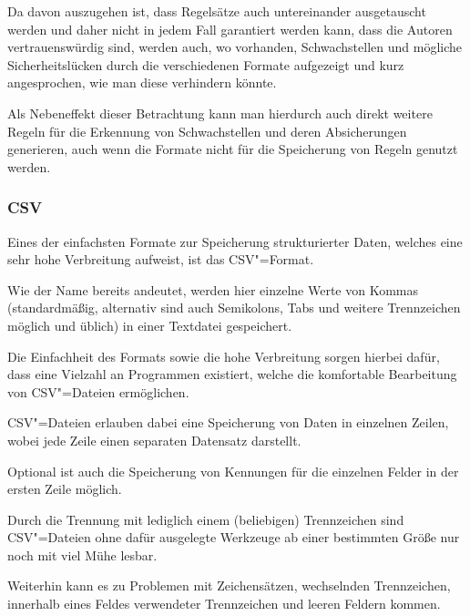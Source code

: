             Da davon auszugehen ist,
            dass Regelsätze auch untereinander ausgetauscht werden und
            daher nicht in jedem Fall garantiert werden kann,
            dass die Autoren vertrauenswürdig sind,
            werden auch, wo vorhanden,
            Schwachstellen und
            mögliche Sicherheitslücken durch die verschiedenen Formate aufgezeigt und
            kurz angesprochen,
            wie man diese verhindern könnte.

            Als Nebeneffekt dieser Betrachtung kann man hierdurch auch direkt weitere Regeln für die Erkennung von Schwachstellen und
            deren Absicherungen generieren,
            auch wenn die Formate nicht für die Speicherung von Regeln genutzt werden.

            \subsubsection{CSV}
                Eines der einfachsten Formate zur Speicherung strukturierter Daten,
                welches eine sehr hohe Verbreitung aufweist,
                ist das
                \gls{CSV}"=Format.

                Wie der Name bereits andeutet,
                werden hier einzelne Werte von Kommas
                (standardmäßig,
                alternativ sind auch Semikolons,
                Tabs und
                weitere Trennzeichen möglich und
                üblich) in einer Textdatei gespeichert.

                Die Einfachheit des Formats sowie
                die hohe Verbreitung sorgen hierbei dafür,
                dass eine Vielzahl an Programmen existiert,
                welche die komfortable Bearbeitung von
                \gls{CSV}"=Dateien ermöglichen.

                \gls{CSV}"=Dateien erlauben dabei eine Speicherung von Daten in einzelnen Zeilen,
                wobei jede Zeile einen separaten Datensatz darstellt.

                Optional ist auch die Speicherung von Kennungen für die einzelnen Felder in der ersten Zeile möglich.

                Durch die Trennung mit lediglich einem
                (beliebigen) Trennzeichen sind
                \gls{CSV}"=Dateien ohne dafür ausgelegte Werkzeuge ab einer bestimmten Größe nur noch mit viel Mühe lesbar.

                Weiterhin kann es zu Problemen mit Zeichensätzen,
                wechselnden Trennzeichen,
                innerhalb eines Feldes verwendeter Trennzeichen und
                leeren Feldern kommen.


